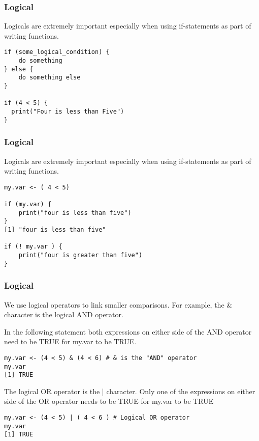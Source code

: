 \documentclass{beamer}
\begin{document}
\begin{frame}[fragile]
\frametitle{Logical}
Logicals are extremely important especially when using if-statements as part of writing functions. 
\begin{verbatim}
if (some_logical_condition) {
    do something
} else {
    do something else
}

if (4 < 5) {
  print("Four is less than Five")
}
\end{verbatim}
\end{frame}


\begin{frame}[fragile]
\frametitle{Logical}
Logicals are extremely important especially when using if-statements as part of writing functions. 
\small
\begin{verbatim}
my.var <- ( 4 < 5)

if (my.var) {
    print("four is less than five")
}
[1] "four is less than five"

if (! my.var ) {
    print("four is greater than five")
}

\end{verbatim}
\end{frame}

\begin{frame}[fragile]
\frametitle{Logical}
We use logical operators to link smaller comparisons. For example, the \& character is the logical AND operator.

In the following statement both expressions on either side of the AND operator need to be TRUE for my.var to be TRUE.

\small
\begin{verbatim}
my.var <- (4 < 5) & (4 < 6) # & is the "AND" operator
my.var
[1] TRUE
\end{verbatim}
\normalsize

The logical OR operator is the | character. Only one of the expressions on either side of the OR operator needs to be TRUE for my.var to be TRUE
\small
\begin{verbatim}
my.var <- (4 < 5) | ( 4 < 6 ) # Logical OR operator
my.var
[1] TRUE
\end{verbatim}
\end{frame}

\end{document}
